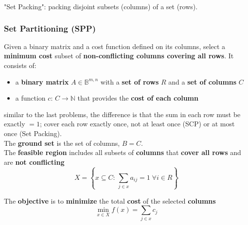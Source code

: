 "Set Packing": packing disjoint subsets (columns) of a set (rows).\\

\newpage

\subsubsection{Set Partitioning (SPP)}
Given a binary matrix and a cost function defined on its columns, select a \textbf{minimum cost} subset of \textbf{non-conflicting columns covering all rows}. It consists of:
\begin{itemize}
	\item a \textbf{binary matrix} $A \in \mathbb{B}^{m,n}$ with a \textbf{set of rows} $R$ and a \textbf{set of
		columns} $C$
	\item a function $c : \, C \rightarrow \mathbb{N}$ that provides the \textbf{cost of each column}
\end{itemize}
similar to the last problems, the difference is that the sum in each row must be exactly $= 1$; cover each row exactly once, not at least once (SCP) or at most once (Set Packing).\\

The \textbf{ground set} is the set of columns, $B = C$.\\

The \textbf{feasible region} includes all subsets of \textbf{columns} that \textbf{cover all rows} and are \textbf{not conflicting}
$$ X = \left\{x \subseteq C : \, \sum_{j \in x} a_{ij} = 1 \; \forall i \in R \right\}$$

The \textbf{objective} is to \textbf{minimize} the total \textbf{cost} of the selected \textbf{columns}
$$ \min_{x \in X} f(x) = \sum_{j \in x} c_j $$

\newpage

